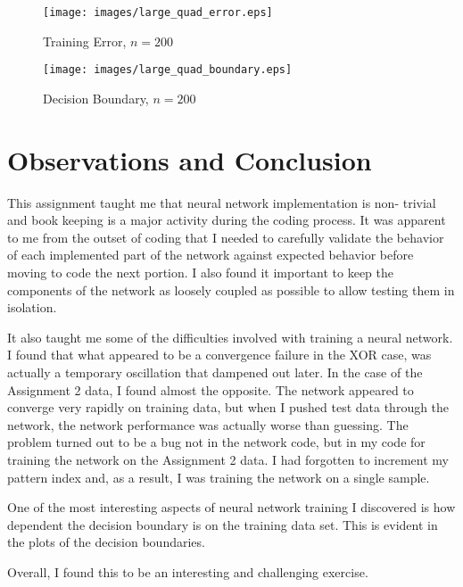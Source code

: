 \documentclass{article}
\begin{document}
\begin{figure}
  \centering
  \texttt{[image: images/large\_quad\_error.eps]}
  \caption{Training Error, $n=200$}
  \label{fig:large-quad-error}
\end{figure}

\begin{figure}
  \centering
  \texttt{[image: images/large\_quad\_boundary.eps]}
  \caption{Decision Boundary, $n=200$}
  \label{fig:large-quad-boundary}
\end{figure}



\section*{Observations and Conclusion}
This assignment taught me that neural network implementation is non-
trivial and book keeping is a major activity during the coding
process.  It was apparent to me from the outset of coding that I
needed to carefully validate the behavior of each implemented part of
the network against expected behavior before moving to code the next
portion. I also found it important to keep the components of the
network as loosely coupled as possible to allow testing them in
isolation.

It also taught me some of the difficulties involved with training a
neural network.  I found that what appeared to be a convergence
failure in the XOR case, was actually a temporary oscillation that
dampened out later.  In the case of the Assignment 2 data, I found
almost the opposite.  The network appeared to converge very rapidly on
training data, but when I pushed test data through the network, the
network performance was actually worse than guessing. The problem
turned out to be a bug not in the network code, but in my code for
training the network on the Assignment 2 data.  I had forgotten to
increment my pattern index and, as a result, I was training the
network on a single sample.

One of the most interesting aspects of neural network training
I discovered is how dependent the decision boundary is on the training
data set.  This is evident in the plots of the decision boundaries.

Overall, I found this to be an interesting and challenging exercise.
\end{document}
